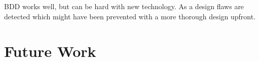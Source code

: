 
BDD works well, but can be hard with new technology. As a design flaws are
detected which might have been prevented with a more thorough design upfront.

\section{Future Work}
